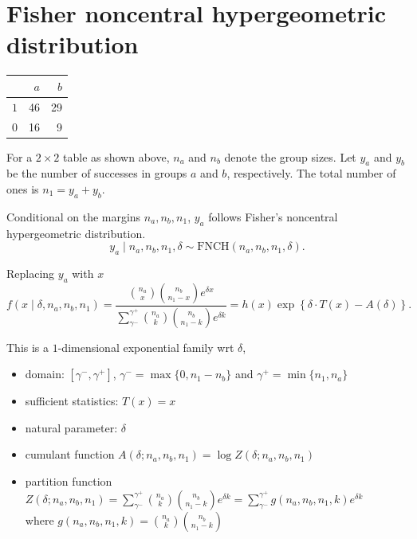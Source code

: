 \newpage

\section{Fisher noncentral hypergeometric distribution}\label{sec:fnch}

\begin{table}
	\centering
	\begin{tabular}{lrr}
		\toprule
		    & $a$ & $b$ \\
		\midrule
		$1$ & 46  & 29  \\
		$0$ & 16  & 9   \\
		\bottomrule
	\end{tabular}
\end{table}

For a $2\times 2$ table as shown above,
$n_a$ and $n_b$ denote the group sizes.
Let $y_a$ and $y_b$ be the number of successes in groups $a$ and $b$, respectively.
The total number of ones is $n_1 = y_a+y_b$.

Conditional on the margins $n_a,n_b,n_1$,
$y_a$ follows Fisher's noncentral hypergeometric distribution.
$$
y_a \mid n_a,n_b,n_1,\delta
\sim \mathrm{FNCH}(n_a,n_b,n_1,\delta).
$$

Replacing $y_a$ with $x$
\begin{equation}\label{eq:fnch_pdf}
	f(x\mid \delta,n_a,n_b,n_1)
	= \frac{\binom{n_a}{x} \binom{n_b}{n_1-x} e^{\delta x}}{\sum_{\gamma^{-}}^{\gamma^{+}} \binom{n_a}{k} \binom{n_b}{n_1 - k} e^{\delta k}}
	= h(x) \exp\left\{\delta \cdot T(x) - A(\delta)\right\}.
\end{equation}

This is a $1$-dimensional exponential family wrt $\delta$,
\begin{itemize}
	\item domain: $[\gamma^{-},\gamma^{+}]$, $\gamma^{-} = \max\{0, n_1-n_b\}$ and $\gamma^{+}=\min\{n_1, n_a\}$
	\item sufficient statistics: $T(x)=x$
	\item natural parameter: $\delta$
	\item cumulant function $A(\delta; n_a,n_b,n_1)=\log Z(\delta; n_a,n_b,n_1)$
	\item partition function
	$Z(\delta; n_a,n_b,n_1)=\sum_{\gamma^{-}}^{\gamma^{+}} \binom{n_a}{k} \binom{n_b}{n_1 - k} e^{\delta k} = \sum_{\gamma^{-}}^{\gamma^{+}} g(n_a,n_b,n_1,k)e^{\delta k}$ \\
	where $g(n_a,n_b,n_1,k)=\binom{n_a}{k} \binom{n_b}{n_1 - k}$
\end{itemize}

